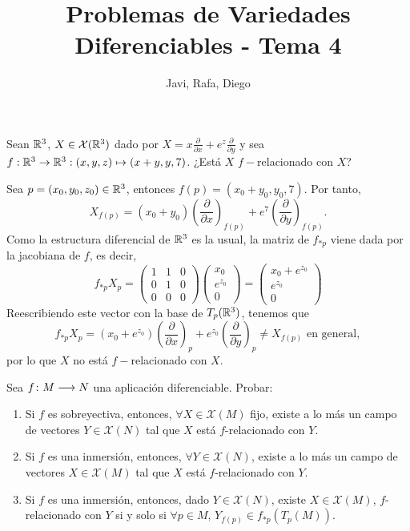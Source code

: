 \documentclass[twoside]{article}
\begin{document}
\title{Problemas de Variedades Diferenciables - Tema 4}
\author{Javi, Rafa, Diego}
\maketitle

\begin{ejercicio}{6}
Sean $\mathbb{R}^3$, $X \in \mathcal{X}(\mathbb{R}^3)$ dado por $X = x\frac{\partial}{\partial x} + e^z\frac{\partial}{\partial y}$ y sea $f :
\mathbb{R}^3 \to \mathbb{R}^3 : (x, y, z) \mapsto (x + y, y, 7)$. ¿Está $X$ $f-$relacionado con $X$?
\end{ejercicio}
\begin{solucion}
Sea $p=(x_0,y_0,z_0)\in\mathbb{R}^3$, entonces $f(p)=(x_0+y_0,y_0,7)$. Por tanto, $$X_{f(p)}=(x_0+y_0)\left(\frac{\partial}{\partial x}\right)_{f(p)} + e^7\left(\frac{\partial}{\partial y}\right)_{f(p)}.$$ %
Como la estructura diferencial de $\mathbb{R}^3$ es la usual, la matriz de $f_{*p}$ viene dada por la jacobiana de $f$, es decir, 
\[f_{*p}X_p=\begin{pmatrix}
1 & 1 & 0\\
0 & 1 & 0\\
0 & 0 & 0
\end{pmatrix}\begin{pmatrix}
x_0\\
e^{z_0}\\
0
\end{pmatrix}=\begin{pmatrix}
x_0+e^{z_0}\\
e^{z_0}\\
0
\end{pmatrix}\]
Reescribiendo este vector con la base de $T_p(\mathbb{R}^3)$, tenemos que 
$$f_{*p}X_p=(x_0+e^{z_0})\left(\frac{\partial}{\partial x}\right)_p + e^{z_0}\left(\frac{\partial}{\partial y}\right)_p\neq X_{f(p)}\text{ en general},$$
por lo que $X$ no está $f-$relacionado con $X$.
\end{solucion}
\newpage
\begin{ejercicio}{7}
Sea $f\colon{M}\longrightarrow{N}$ una aplicación diferenciable. Probar:
\begin{enumerate}
\item Si $f$ es sobreyectiva, entonces, $\forall X \in \mathcal{X}(M)$ fijo, existe a lo más un campo de vectores $Y\in \mathcal{X}(N)$ tal que $X$ está $f$-relacionado con $Y$. 
\item Si $f$ es una inmersión, entonces, $\forall Y \in \mathcal{X}(N)$, existe a lo más un campo de vectores $X\in \mathcal{X}(M)$ tal que $X$ está $f$-relacionado con $Y$. 
\item Si $f$ es una inmersión, entonces, dado $Y \in \mathcal{X}(N)$, existe $X\in \mathcal{X}(M)$, $f$-relacionado con $Y$ si y solo si $\forall p \in M$, $Y_{f(p)}\in f_{\ast p}(T_p(M))$.
\end{enumerate}
\end{ejercicio}
\end{document}
